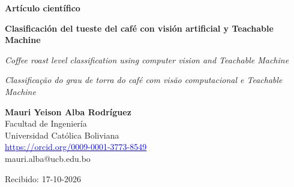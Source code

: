 \begin{center}
{\color{tm}\bfseries\fontsize{16}{19}\selectfont Artículo científico\par}
\vspace{10pt}
{\bfseries\fontsize{14}{17}\selectfont Clasificación del tueste del café con visión artificial y Teachable Machine\par}
\vspace{6pt}
{\itshape{} Coffee roast level classification using computer vision and Teachable Machine\par}
\vspace{4pt}
{\itshape{} Classificação do grau de torra do café com visão computacional e Teachable Machine\par}
\vspace{14pt}
{
\textbf{Mauri Yeison Alba Rodríguez}\\
Facultad de Ingeniería\\
Universidad Católica Boliviana\\
\href{https://orcid.org/0009-0001-3773-8549}{\textcolor{blue}{\underline{https://orcid.org/0009-0001-3773-8549}}}\\
mauri.alba@ucb.edu.bo\par}
\end{center}

\vspace{4pt}
\noindent Recibido: 17-10-2026
